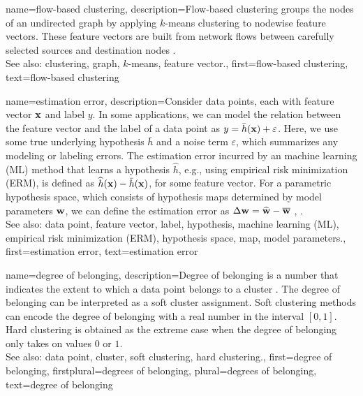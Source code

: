 {
{name={flow-based clustering},
	description={Flow-based clustering groups the nodes 
		of an undirected graph by applying $k$-means clustering to nodewise 
		feature vectors. These feature vectors are built from network flows between 
		carefully selected sources and destination nodes \cite{FlowSpecClustering2021}. 
					\\ 
		See also: clustering, graph, $k$-means, feature vector.}, 
	first={flow-based clustering},
	text={flow-based clustering} 
}



{name={estimation error},
	description={Consider data points, each with feature vector ${\bf x}$ and label 
		$y$. In some applications, we can model the relation between the feature vector and the label
		of a data point as $y = \bar{h}({\bf x}) + \varepsilon$. Here, we 
		use some true underlying hypothesis $\bar{h}$ and a noise term $\varepsilon$, 
		which summarizes any modeling or labeling errors. The estimation error incurred by an machine learning (ML) 
		method that learns a hypothesis $\widehat{h}$, e.g., using empirical risk minimization (ERM), is defined as 
		$\widehat{h}({\bf x}) - \bar{h}({\bf x})$, for some feature vector. 
		For a parametric hypothesis space, which consists of hypothesis maps determined by 
		model parameters ${\bf w}$, we can define the estimation error as $\Delta {\bf w} = \widehat{{\bf w}} - \overline{{\bf w}}$ \cite{hastie01statisticallearning}, \cite{kay}.
					\\ 
		See also: data point, feature vector, label, hypothesis, machine learning (ML), empirical risk minimization (ERM), hypothesis space, map, model parameters.},
	first={estimation error},
	text={estimation error} 
}


{name={degree of belonging}, 
	description={Degree of belonging is a number that indicates the extent to which a data point 
		belongs to a cluster \cite[Ch. 8]{MLBasics}. The degree of belonging can be 
		interpreted as a soft cluster assignment. Soft clustering methods can 
		encode the degree of belonging with a real number in the interval $[0,1]$. 
		Hard clustering is obtained as the extreme case when the degree of belonging 
		only takes on values $0$ or $1$.
					\\ 
		See also: data point, cluster, soft clustering, hard clustering.}, 
	first={degree of belonging},
	firstplural={degrees of belonging},
	plural={degrees of belonging},
	text={degree of belonging} 
}

}
